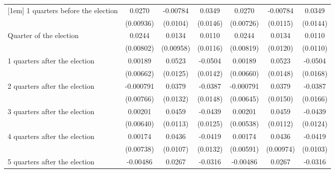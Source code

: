 \begin{table}[!ht]
\begin{tabular}{l*{6}{c}}
[1em]
 1 quarters before the election&      0.0270\sym{**} &    -0.00784         &      0.0349\sym{*}  &      0.0270\sym{***}&    -0.00784         &      0.0349\sym{*}  \\
                    &   (0.00936)         &    (0.0104)         &    (0.0146)         &   (0.00726)         &    (0.0115)         &    (0.0144)         \\
[1em]
Quarter of the election&      0.0244\sym{**} &      0.0134         &      0.0110         &      0.0244\sym{**} &      0.0134         &      0.0110         \\
                    &   (0.00802)         &   (0.00958)         &    (0.0116)         &   (0.00819)         &    (0.0120)         &    (0.0110)         \\
[1em]
 1 quarters after the election&     0.00189         &      0.0523\sym{***}&     -0.0504\sym{***}&     0.00189         &      0.0523\sym{***}&     -0.0504\sym{**} \\
                    &   (0.00662)         &    (0.0125)         &    (0.0142)         &   (0.00660)         &    (0.0148)         &    (0.0168)         \\
[1em]
 2 quarters after the election&   -0.000791         &      0.0379\sym{**} &     -0.0387\sym{**} &   -0.000791         &      0.0379\sym{*}  &     -0.0387\sym{*}  \\
                    &   (0.00766)         &    (0.0132)         &    (0.0148)         &   (0.00645)         &    (0.0150)         &    (0.0166)         \\
[1em]
 3 quarters after the election&     0.00201         &      0.0459\sym{***}&     -0.0439\sym{***}&     0.00201         &      0.0459\sym{***}&     -0.0439\sym{***}\\
                    &   (0.00640)         &    (0.0113)         &    (0.0125)         &   (0.00538)         &    (0.0112)         &    (0.0124)         \\
[1em]
 4 quarters after the election&     0.00174         &      0.0436\sym{***}&     -0.0419\sym{**} &     0.00174         &      0.0436\sym{***}&     -0.0419\sym{***}\\
                    &   (0.00738)         &    (0.0107)         &    (0.0132)         &   (0.00591)         &   (0.00974)         &    (0.0103)         \\
[1em]
 5 quarters after the election&    -0.00486         &      0.0267\sym{**} &     -0.0316\sym{**} &    -0.00486         &      0.0267\sym{*}  &     -0.0316\sym{**} \\

\end{tabular}
\end{table}
